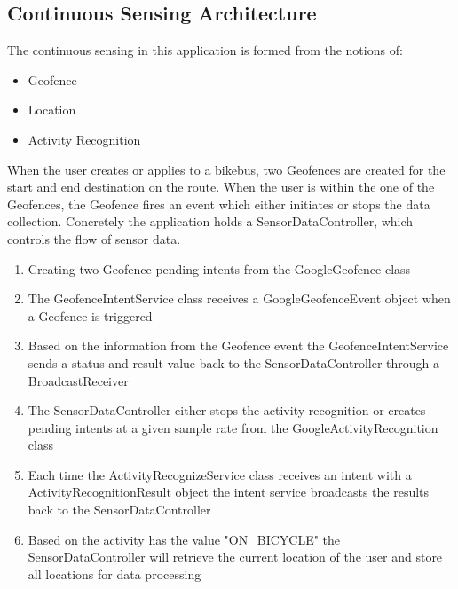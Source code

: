 \subsection{Continuous Sensing Architecture}
\label{sec:continuous_sensing_Architecture}

The continuous sensing in this application is formed from the notions of:
\begin{itemize}
    \item Geofence 
    \item Location 
    \item Activity Recognition
\end{itemize}

When the user creates or applies to a bikebus, two Geofences are created for the start and end destination on the route. When the user is within the one of the Geofences, the Geofence fires an event which either initiates or stops the data collection.
Concretely the application holds a SensorDataController, which controls the flow of sensor data. 
\begin{enumerate}
    \item Creating two Geofence pending intents from the GoogleGeofence class
    \item The GeofenceIntentService class receives a GoogleGeofenceEvent object when a Geofence is triggered
    \item Based on the information from the Geofence event the GeofenceIntentService sends a status and result value back to the SensorDataController through a BroadcastReceiver
    \item The SensorDataController either stops the activity recognition or creates pending intents at a given sample rate from the GoogleActivityRecognition class
    \item Each time the ActivityRecognizeService class receives an intent with a ActivityRecognitionResult object the intent service broadcasts the results back to the SensorDataController
    \item Based on the activity has the value "ON\_BICYCLE" the SensorDataController will retrieve the current location of the user and store all locations for data processing
\end{enumerate}

